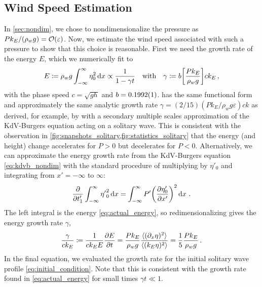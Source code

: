 \documentclass{jfm}
\renewcommand*{\epsilon}{\varepsilon}
\begin{document}
\subsection{\label{sec:press_mag} Wind Speed Estimation}
In \cref{sec:nondim}, we chose to nondimensionalize the pressure as $P
k_E/(\rho_w g) = \order{\epsilon}$.
Now, we estimate the wind speed associated with such a pressure
to show that this choice is reasonable.
First we need the growth rate of the energy $E$, which we numerically fit
to
\begin{equation}
  E \coloneqq \rho_w g \int_{-\infty}^{\infty} {\eta}_0^2 \dd{x}
  \propto \frac{1}{1 - \gamma t}
  \qq{with}
  \gamma \coloneqq b \bqty{\frac{P k_E}{\rho_w g}} c k_E
  \,,
  \label{eq:actual_energy}
\end{equation}
with the phase speed $c = \sqrt{gh}$ and $b = \num{0.1992 \pm 0.0001}$.
 has the same functional form and approximately
the same analytic growth rate $\gamma = (2/15) (P k_E/\rho_w g
\epsilon) ck$ as derived, for example, by \citet{zdyrski2019effects}
with a secondary multiple scales approximation of the KdV-Burgers
equation acting on a solitary wave.
This is consistent with the observation in
\cref{fig:snapshots_solitary,fig:statistics_solitary} that the energy
(and height) change accelerates for $P>0$ but decelerates for $P<0$.
Alternatively, we can approximate the energy growth rate from the
KdV-Burgers equation \cref{eq:kdvb_nondim} with the standard procedure
\citep[\eg][]{mei2005nonlinear} of multiplying by $\eta'_0$ and
integrating from $x'=-\infty$ to $\infty$:
\begin{equation}
  \pdv{t'_1} \int_{-\infty}^{\infty} {\eta'}_0^2 \dd{x}
  = \int_{-\infty}^{\infty} P' \pqty{\pdv{\eta'_0}{x'}}^2
  \dd{x} \,.
\end{equation}
The left integral is the energy \cref{eq:actual_energy}, so
redimensionalizing gives the energy growth rate $\gamma$,
\begin{equation}
  \frac{\gamma}{c k_E} \coloneqq
  \frac{1}{c k_E E} \pdv{E}{t}
  = \frac{P k_E}{\rho_w g} \frac{\langle (\partial_x \eta)^2 \rangle}
    {\langle (k_E \eta)^2 \rangle}
  = \frac{1}{5} \frac{P k_E}{\rho_w g}
  \,.
  \label{eq:gamma_vs_P_solitary}
\end{equation}
In the final equation, we evaluated the growth rate for the initial
solitary wave profile \cref{eq:initial_condition}.
Note that this is consistent with the growth rate found in
\cref{eq:actual_energy} for small times $\gamma t \ll 1$.
\end{document}

